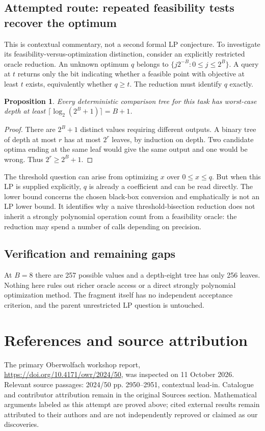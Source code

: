 \documentclass[11pt]{article}
\newtheorem{proposition}{Proposition}
\begin{document}
\subsection{Attempted route: repeated feasibility tests recover the optimum}
This is contextual commentary, not a second formal LP conjecture. To investigate its feasibility-versus-optimization distinction, consider an explicitly restricted oracle reduction. An unknown optimum $q$ belongs to
$\{j2^{-B}:0\le j\le2^B\}$. A query at $t$ returns only the bit indicating whether a feasible point with objective at least $t$ exists, equivalently whether $q\ge t$. The reduction must identify $q$ exactly.
\begin{proposition}
Every deterministic comparison tree for this task has worst-case depth at least $\lceil\log_2(2^B+1)\rceil=B+1$.
\end{proposition}
\begin{proof}
There are $2^B+1$ distinct values requiring different outputs. A binary tree of depth at most $r$ has at most $2^r$ leaves, by induction on depth. Two candidate optima ending at the same leaf would give the same output and one would be wrong. Thus $2^r\ge2^B+1$.
\end{proof}
The threshold question can arise from optimizing $x$ over $0\le x\le q$. But when this LP is supplied explicitly, $q$ is already a coefficient and can be read directly. The lower bound concerns the chosen black-box conversion and emphatically is not an LP lower bound. It identifies why a naive threshold-bisection reduction does not inherit a strongly polynomial operation count from a feasibility oracle: the reduction may spend a number of calls depending on precision.
\subsection{Verification and remaining gaps}
At $B=8$ there are 257 possible values and a depth-eight tree has only 256 leaves. Nothing here rules out richer oracle access or a direct strongly polynomial optimization method. The fragment itself has no independent acceptance criterion, and the parent unrestricted LP question is untouched.

\section{References and source attribution}
The primary Oberwolfach workshop report, \url{https://doi.org/10.4171/owr/2024/50}, was inspected on 11 October 2026. Relevant source passages: 2024/50 pp. 2950--2951, contextual lead-in. Catalogue and contributor attribution remain in the original Sources section. Mathematical arguments labeled as this attempt are proved above; cited external results remain attributed to their authors and are not independently reproved or claimed as our discoveries.
\end{document}
